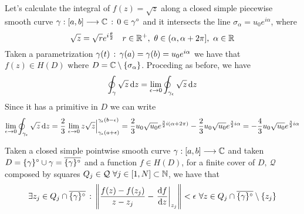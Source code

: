 \documentclass[../complete.tex]{subfiles}
\begin{document}
\begin{eg}
	Let's calculate the integral of $f(z)=\sqrt{z}$ along a closed simple piecewise smooth curve $\gamma:[a,b]\overset{}{\longrightarrow}\mathbb{C}\, :\, 0\in\gamma^{\circ}$ and it intersects the line $\sigma_\alpha=u_0e^{i\alpha}$, where
	\begin{equation*}
		\sqrt{z}=\sqrt{r}e^{i\frac{\theta}{2}}\quad r\in\mathbb{R}^+,\ \theta\in(\alpha,\alpha+2\pi],\ \alpha\in\mathbb{R}
	\end{equation*}
	Taken a parametrization $\gamma(t)\, :\, \gamma(a)=\gamma(b)=u_0e^{i\alpha}$ we have that $f(z)\in H(D)$ where $D=\mathbb{C}\setminus\{\sigma_\alpha\}$. Proceding as before, we have
	\begin{equation*}
		\oint_{\gamma}^{}\sqrt{z}\operatorname{d\!} z=\lim_{\epsilon\to0}\oint_{\gamma_\epsilon}^{}\sqrt{z}\operatorname{d\!} z
	\end{equation*}
	Since it has a primitive in $D$ we can write
	\begin{equation*}
		\lim_{\epsilon\to0}\oint_{\gamma_\epsilon}\sqrt{z}\operatorname{d\!} z=\frac{2}{3}\left.\lim_{\epsilon\to0}z\sqrt{z}\right|^{\gamma_\epsilon(b-\epsilon)}_{\gamma_\epsilon(a+\epsilon)}=\frac{2}{3}u_0\sqrt{u_0}e^{\frac{3}{2}i(\alpha+2\pi)}-\frac{2}{3}u_0\sqrt{u_0}e^{\frac{3}{2}i\alpha}=-\frac{4}{3}u_0\sqrt{u_0}e^{\frac{3}{2}i\alpha}
	\end{equation*}
\end{eg}
\begin{lem}
	Taken a closed simple pointwise smooth curve $\gamma:[a,b]\overset{}{\longrightarrow}\mathbb{C}$ and taken $D=\{\gamma\}^{\circ}\cup\gamma=\overline{\{\gamma\}^{\circ}}$ and a function $f\in H(D)$, for a finite cover of $D,\ \mathcal{Q}$ composed by squares $Q_j\in\mathcal{Q}\ \forall j\in[1,N]\subset\N$, we have that
	\begin{equation*}
		\exists z_j\in Q_j\cap\cc{\intr{\{\gamma\}}}\st\norm{\frac{f(z)-f(z_j)}{z-z_j}-\left.\derivative{f}{z}\right|_{z_j}}<\epsilon\ \forall z\in Q_j\cap\cc{\intr{\{\gamma\}}}\setminus\{z_j\}
	\end{equation*}
\end{lem}
\end{document}
